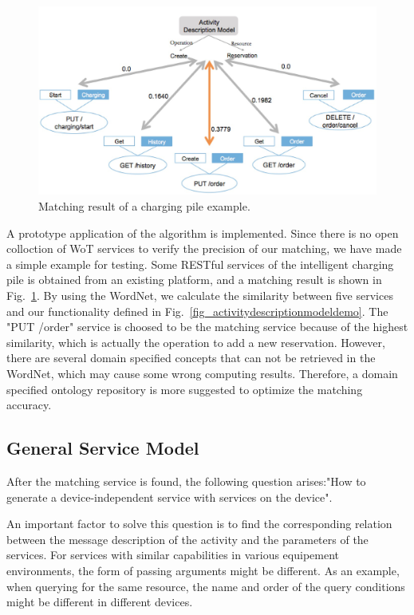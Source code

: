 \begin{figure}[!t]
\centering
\includegraphics[width=1.0\linewidth]{./graph/matching}
\caption{Matching result of a charging pile example.}
\label{fig_matching}
\end{figure}

A prototype application of the algorithm is implemented. Since there is no open colloction of WoT services to verify the precision of our matching, we have made a simple example for testing. Some RESTful services of the intelligent charging pile is obtained from an existing platform, and a matching result is shown in Fig.~\ref{fig_matching}. By using the WordNet, we calculate the similarity between five services and our functionality defined in Fig.~\ref{fig_activitydescriptionmodeldemo}. The "PUT /order" service is choosed to be the matching service because of the highest similarity, which is actually the operation to add a new reservation. However, there are several domain specified concepts that can not be retrieved in the WordNet, which may cause some wrong computing results. Therefore, a domain specified ontology repository is more suggested to optimize the matching accuracy. 

\subsection{General Service Model}
After the matching service is found, the following question arises:"How to generate a device-independent service with services on the device". 

An important factor to solve this question is to find the corresponding relation between the message description of the activity and the parameters of the services. For services with similar capabilities in various equipement environments, the form of passing arguments might be different. As an example, when querying for the same resource, the name and order of the query conditions might be different in different devices. 

